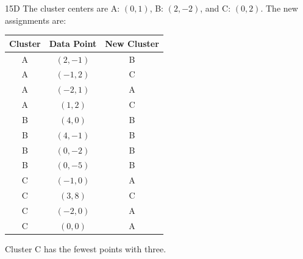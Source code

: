 \begin{solution}{15}{D}
The cluster centers are A: $(0, 1)$, B: $(2, -2)$, and C: $(0, 2)$. The new assignments are:
\begin{center}
\begin{tabular}{|c|c|c|}
\hline
Cluster & Data Point & New Cluster \\ \hline
A & $(2, -1)$  & B \\ \hline
A & $(-1, 2)$  & C \\ \hline
A & $(-2, 1)$  & A \\ \hline
A & $(1, 2)$   & C \\ \hline
B & $(4, 0)$   & B \\ \hline
B & $(4, -1)$  & B \\ \hline
B & $(0, -2)$  & B \\ \hline
B & $(0, -5)$  & B \\ \hline
C & $(-1, 0)$  & A \\ \hline
C & $(3, 8)$   & C \\ \hline
C & $(-2, 0)$  & A \\ \hline
C & $(0, 0)$   & A \\ \hline
\end{tabular}
\end{center}
Cluster C has the fewest points with three.
\end{solution}

